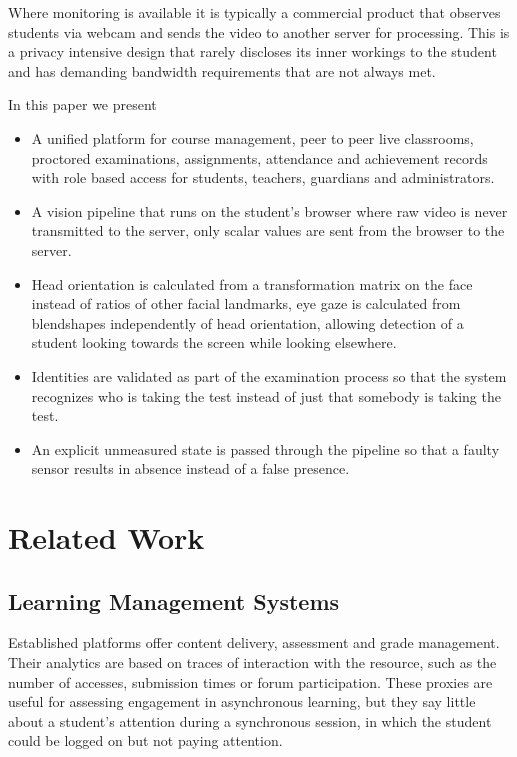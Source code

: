 \documentclass[conference]{IEEEtran}
\begin{document}
Where monitoring is available it is typically a commercial product
that observes students via webcam and sends the video to another
server for processing. This is a privacy intensive design that rarely
discloses its inner workings to the student and has demanding bandwidth
requirements that are not always met.

In this paper we present

\begin{itemize}
\item A unified platform for course management, peer to peer live
classrooms, proctored examinations, assignments, attendance and
achievement records with role based access for students, teachers,
guardians and administrators.
\item A vision pipeline that runs on the student's browser where
raw video is never transmitted to the server, only scalar values
are sent from the browser to the server.
\item Head orientation is calculated from a transformation matrix
on the face instead of ratios of other facial landmarks, eye gaze
is calculated from blendshapes independently of head orientation,
allowing detection of a student looking towards the screen while
looking elsewhere.
\item Identities are validated as part of the examination process so
that the system recognizes who is taking the test instead of just
that somebody is taking the test.
\item An explicit unmeasured state is passed through the pipeline
so that a faulty sensor results in absence instead of a false
presence.
\end{itemize}

\section{Related Work}

\subsection{Learning Management Systems}

Established platforms offer content delivery, assessment and grade
management. Their analytics are based on traces of interaction with the
resource, such as the number of accesses, submission times or forum
participation. These proxies are useful for assessing engagement in
asynchronous learning, but they say little about a student's attention
during a synchronous session, in which the student could be logged on
but not paying attention.
\end{document}

